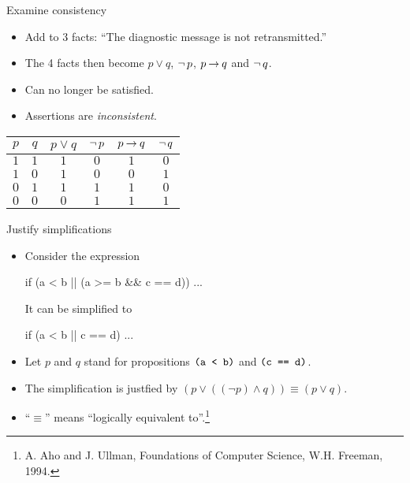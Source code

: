 \documentclass[style=sailor,size=12pt]{powerdot}
\begin{document}
\begin{wideslide}[bm=,toc=]{Examine consistency}
\begin{itemize}
\item Add to 3 facts: ``The diagnostic message is not retransmitted.''
\item The 4 facts then become $p\lor q$, $\mathop{\neg} p$, $p\mathbin{\rightarrow} q$ and $\mathop{\neg} q$.
\item Can no longer be satisfied.
\item Assertions are {\em inconsistent\/}.
\end{itemize}
\begin{center}
\begin{tabular}{c|c||c|c|c|c}
$p$ & $q$ & $p \lor q$ & $\mathop{\neg} p$ & $p \mathbin{\rightarrow} q$ & $\mathop{\neg} q$ \\
\hline
$1$ & $1$ & $1$ & $0$ & $1$ & $0$\\
$1$ & $0$ & $1$ & $0$ & $0$ & $1$\\
$0$ & $1$ & $1$ & $1$ & $1$ & $0$\\
$0$ & $0$ & $0$ & $1$ & $1$ & $1$
\end{tabular}
\end{center}
\end{wideslide}

\begin{wideslide}[bm=,toc=]{Justify simplifications}
\begin{itemize}
\item Consider the expression
\vspace{-1em}
\begin{program}
if (a < b || (a >= b \&\& c == d)) ...
\end{program}
It can be simplified to
\vspace{-1em}
\begin{program}
if (a < b || c == d) ...
\end{program}
\item Let $p$ and $q$ stand for propositions $\mbox{\tt (a < b)}$ and $\mbox{\tt (c == d)}$.
\item The simplification is justfied by $(p\vee ((\neg p) \wedge q)) \equiv (p\vee q)$.
\item ``$\equiv$'' means ``logically equivalent to''.\footnote{
A. Aho and J. Ullman, Foundations of Computer Science, W.H. Freeman, 1994.}
\end{itemize}
\end{wideslide}
\end{document}
